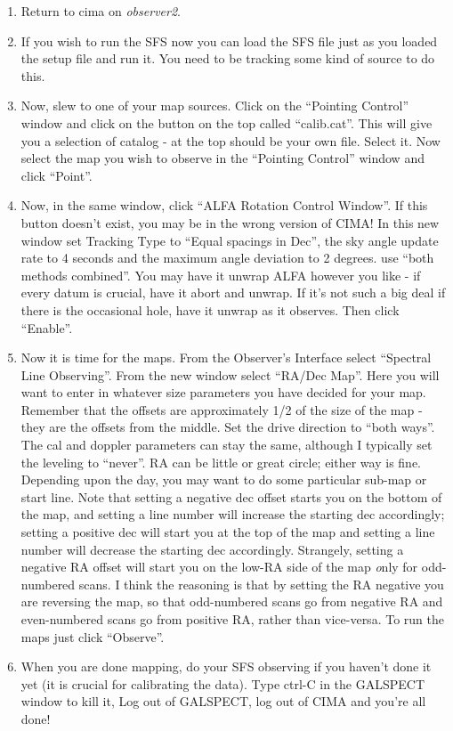 \begin{enumerate}
\begin{enumerate}
\item Return to cima on {\it observer2}.

\item If you wish to run the SFS now you can load the SFS file just as you loaded the setup file and run it. You need to be tracking some kind of source to do this.

\item Now, slew to one of your map sources. Click on the ``Pointing Control'' window and click on the button on the top called ``calib.cat''. This will give you a selection of catalog - at the top should be your own file. Select it. Now select the map you wish to observe in the ``Pointing Control'' window and click ``Point''. 

\item Now, in the same window, click ``ALFA Rotation Control Window''. If this button doesn't exist, you may be in the wrong version of CIMA! In this new window set Tracking Type to ``Equal spacings in Dec'', the sky angle update rate to 4 seconds and the maximum angle deviation to 2 degrees. use ``both methods combined''. You may have it unwrap ALFA however you like - if every datum is crucial, have it abort and unwrap. If it's not such a big deal if there is the occasional hole, have it unwrap as it observes. Then click ``Enable''.

\item Now it is time for the maps. From the Observer's Interface select ``Spectral Line Observing''. From the new window select ``RA/Dec Map''. Here you will want to enter in whatever size parameters you have decided for your map. Remember that the offsets are approximately 1/2 of the size of the map - they are the offsets from the middle. Set the drive direction to ``both ways''. The cal and doppler parameters can stay the same, although I typically set the leveling to ``never''. RA can be little or great circle; either way is fine. Depending upon the day, you may want to do some particular sub-map or start line. Note that setting a negative dec offset starts you on the bottom of the map, and setting a line number will increase the starting dec accordingly; setting a positive dec will start you at the top of the map and setting a line number will decrease the starting dec accordingly. Strangely, setting a negative RA offset will start you on the low-RA side of the map {\emph only for odd-numbered scans}. I think the reasoning is that by setting the RA negative you are reversing the map, so that odd-numbered scans go from negative RA and even-numbered scans go from positive RA, rather than vice-versa. To run the maps just click ``Observe''.

\item When you are done mapping, do your SFS observing if you haven't done it yet (it is crucial for calibrating the data). Type ctrl-C in the GALSPECT window to kill it, Log out of GALSPECT, log out of CIMA and you're all done!

\end{enumerate}
\end{enumerate}







